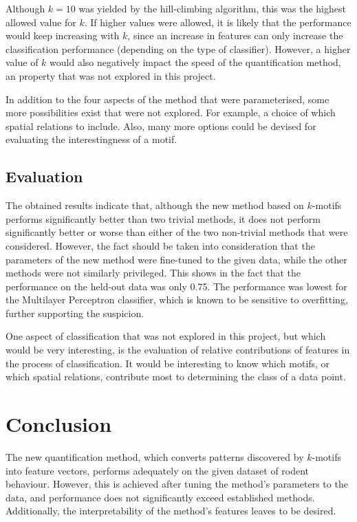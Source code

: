 \documentclass[conference,a4paper,twoside]{IEEEtran}
\begin{document}
Although $k=10$ was yielded by the hill-climbing algorithm, this was the highest allowed value for $k$. If higher values were allowed, it is likely that the performance would keep increasing with $k$, since an increase in features can only increase the classification performance (depending on the type of classifier). However, a higher value of $k$ would also negatively impact the speed of the quantification method, an property that was not explored in this project.

In addition to the four aspects of the method that were parameterised, some more possibilities exist that were not explored. For example, a choice of which spatial relations to include. Also, many more options could be devised for evaluating the interestingness of a motif.

\subsection{Evaluation}
\label{sec:disc_evaluate}
The obtained results indicate that, although the new method based on $k$-motifs performs significantly better than two trivial methods, it does not perform significantly better or worse than either of the two non-trivial methods that were considered. However, the fact should be taken into consideration that the parameters of the new method were fine-tuned to the given data, while the other methods were not similarly privileged. This shows in the fact that the performance on the held-out data was only 0.75. The performance was lowest for the Multilayer Perceptron classifier, which is known to be sensitive to overfitting, further supporting the suspicion.

One aspect of classification that was not explored in this project, but which would be very interesting, is the evaluation of relative contributions of features in the process of classification. It would be interesting to know which motifs, or which spatial relations, contribute most to determining the class of a data point.

\section{Conclusion}
The new quantification method, which converts patterns discovered by $k$-motifs into feature vectors, performs adequately on the given dataset of rodent behaviour. However, this is achieved after tuning the method's parameters to the data, and performance does not significantly exceed established methods. Additionally, the interpretability of the method's features leaves to be desired.
\end{document}
